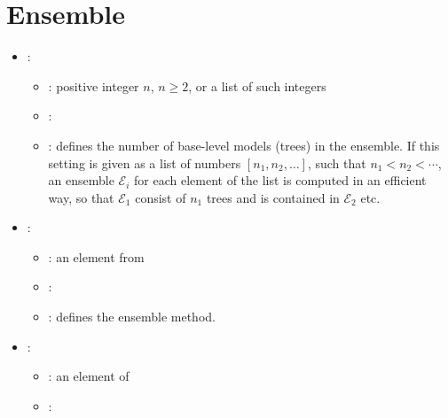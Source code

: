 \section{Ensemble}


\begin{itemize}
    \item {}:
           \begin{itemize}
                \item \optionPossibleValues{}: positive integer $n$, $n \geq 2$, or a list of such integers
                \item \optionDefaultValue{}: 
                \item \optionDescrption{}: defines the number of base-level models (trees) in the ensemble. If this
                setting is given as a list of numbers $[n_1, n_2, \dots]$, such that $n_1 < n_2 < \cdots$, an ensemble $\mathcal{E}_i$ for each element of the list is computed in an efficient way, so that $\mathcal{E}_1$ consist of $n_1$ trees and is contained in $\mathcal{E}_2$ etc.
           \end{itemize}
    \item {}:
           \begin{itemize}
                \item \optionPossibleValues{}: an element from 
                \item \optionDefaultValue{}: 
                \item \optionDescrption{}: defines the ensemble method.
           \end{itemize}
    \item {}:
           \begin{itemize}
                \item \optionPossibleValues{}: an element of 
                \item \optionDefaultValue{}: 

\end{itemize}
\end{itemize}
